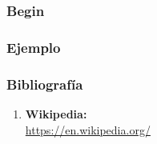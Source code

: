\documentclass[10pt]{beamer}
\title{}
\subtitle{Ejemplo: openMP}
\date{}
\author{Luis María Costero Valero\\Jesús Javier Domenech Arellano\\Hristo
  Ivanov Ivanov}
\institute{10 Enero 2016}
\begin{document}
\maketitle







\begin{frame}
  \frametitle{Begin}
\end{frame}


\begin{frame}
  \frametitle{Ejemplo}
\end{frame}

\begin{frame}
  \frametitle{Bibliografía}
  
  \begin{enumerate}
  \item \textbf{Wikipedia:}\\\url{https://en.wikipedia.org/}
  \end{enumerate}
\end{frame}
\end{document}
